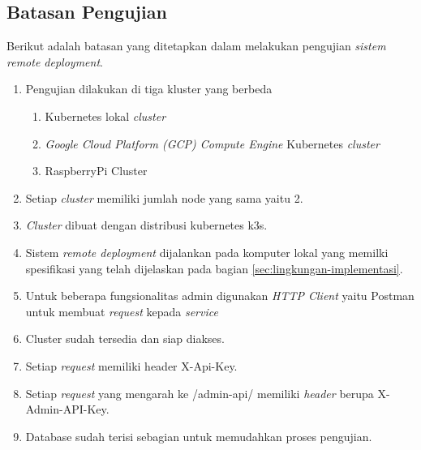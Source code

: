 \subsection{Batasan Pengujian}
\label{subsec:batasan-pengujian}
Berikut adalah batasan yang ditetapkan dalam melakukan pengujian \textit{sistem remote deployment}.

\begin{enumerate}
  \item Pengujian dilakukan di tiga kluster yang berbeda
        \begin{enumerate}
          \item Kubernetes lokal \textit{cluster}
          \item \textit{Google Cloud Platform (GCP) Compute Engine} Kubernetes \textit{cluster}
          \item RaspberryPi Cluster
        \end{enumerate}
  \item Setiap \textit{cluster} memiliki jumlah node yang sama yaitu 2.
  \item \textit{Cluster} dibuat dengan distribusi kubernetes k3s.
  \item Sistem \textit{remote deployment} dijalankan pada komputer lokal yang memilki spesifikasi yang telah dijelaskan pada bagian \ref{sec:lingkungan-implementasi}.
  \item Untuk beberapa fungsionalitas admin digunakan \textit{HTTP Client} yaitu Postman untuk membuat \textit{request} kepada \textit{service}
  \item Cluster sudah tersedia dan siap diakses.
  \item Setiap \textit{request} memiliki header X-Api-Key.
  \item Setiap \textit{request} yang mengarah ke /admin-api/ memiliki \textit{header} berupa X-Admin-API-Key.
  \item Database sudah terisi sebagian untuk memudahkan proses pengujian.
\end{enumerate}